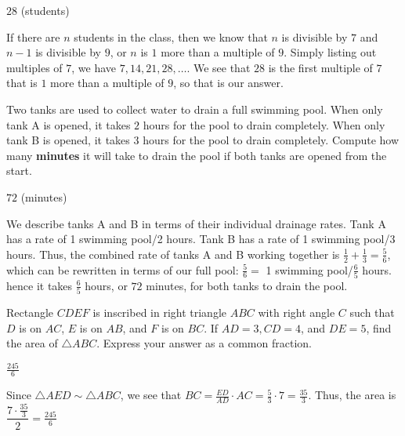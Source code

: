 \documentclass[11pt]{article}
\begin{document}
\begin{answer}
$\boxed{28}$ (students)
\end{answer}

\begin{solution}
If there are $n$ students in the class, then we know that $n$ is divisible by $7$ and $n-1$ is divisible by $9$, or $n$ is $1$ more than a multiple of $9$. Simply listing out multiples of $7$, we have $7, 14, 21, 28, \ldots$. We see that $\boxed{28}$ is the first multiple of $7$ that is $1$ more than a multiple of $9$, so that is our answer.
\end{solution}


\begin{problem}%
Two tanks are used to collect water to drain a full swimming pool. When only tank A is opened, it takes $2$ hours for the pool to drain completely. When only tank B is opened, it takes $3$ hours for the pool to drain completely. Compute how many \textbf{minutes} it will take to drain the pool if both tanks are opened from the start.
\end{problem}

\begin{answer}
$\boxed{72}$ (minutes)
\end{answer}

\begin{solution}
We describe tanks A and B in terms of their individual drainage rates. Tank A has a rate of 1 swimming pool/2 hours. Tank B has a rate of 1 swimming pool/3 hours. Thus, the combined rate of tanks A and B working together is $\frac{1}{2} + \frac{1}{3} = \frac{5}{6}$, which can be rewritten in terms of our full pool: $\frac{5}{6} =$ 1 swimming pool/$\frac{6}{5}$ hours. hence it takes $\frac{6}{5}$ hours, or $\boxed{72}$ minutes, for both tanks to drain the pool.
\end{solution}


\begin{problem}%
Rectangle $CDEF$ is inscribed in right triangle $ABC$ with right angle $C$ such that $D$ is on $AC$, $E$ is on $AB$, and $F$ is on $BC$. If $AD=3, CD=4$, and $DE=5$, find the area of $\triangle ABC$. Express your answer as a common fraction.
\end{problem}

\begin{answer}
$\boxed{\frac{245}{6}}$
\end{answer}

\begin{solution}
Since $\triangle AED \sim \triangle ABC$, we see that $BC = \frac{ED}{AD} \cdot AC = \frac{5}{3} \cdot 7 = \frac{35}{3}$. Thus, the area is $\dfrac{7 \cdot \frac{35}{3}}{2} = \boxed{\frac{245}{6}}$
\end{solution}
\end{document}
